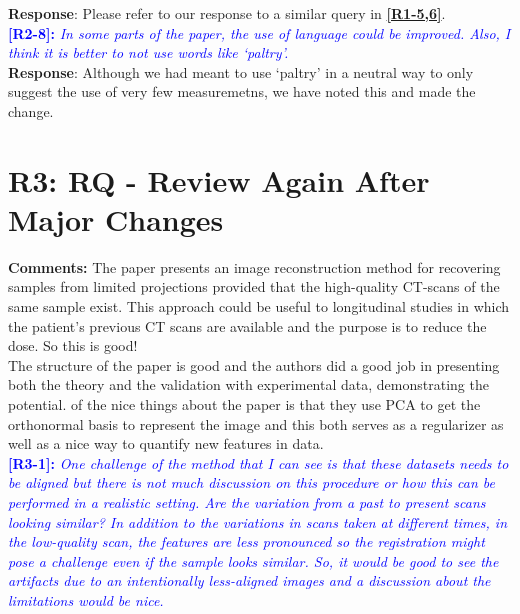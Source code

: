 \documentclass[11pt]{article}
\begin{document}
\textbf{Response}: Please refer to our response to a similar query in \textcolor{blue}{\textbf{\hyperlink{hyperparameters}{[R1-5,6]}}}.\\

\vspace{0.5cm}\textcolor{blue}{\textbf{[R2-8]:} \textit{In some parts of the paper, the use of language could be improved. Also, I think it is better to not use words like `paltry'.}}\\

\textbf{Response}: Although we had meant to use `paltry' in a neutral way to only suggest the use of very few measuremetns, we  have noted this and made the change.\\

\section{R3: RQ - Review Again After Major Changes}

\textbf{Comments:} The paper presents an image reconstruction method for recovering samples from limited projections provided that the high-quality CT-scans of the same sample exist. This approach could be useful to longitudinal studies in which the patient's previous CT scans are available and the purpose is to reduce the dose. So this is good!\\

The structure of the paper is good and the authors did a good job in presenting both the theory and the validation with experimental data, demonstrating the potential. of the nice things about the paper is that they use PCA to get the orthonormal basis to represent the image and this both serves as a regularizer as well as a nice way to quantify new features in data.
\\

\vspace{0.5cm}\textcolor{blue}{\textbf{[R3-1]:} \textit{One challenge of the method that I can see is that these datasets needs to be aligned but there is not much discussion on this procedure or how this can be performed in a realistic setting. Are the variation from a past to present scans looking similar? In addition to the variations in scans taken at different times, in the low-quality scan, the features are less pronounced so the registration might pose a challenge even if the sample looks similar. So, it would be good to see the artifacts due to an intentionally less-aligned images and a discussion about the limitations would be nice.
}}\\
\end{document}
